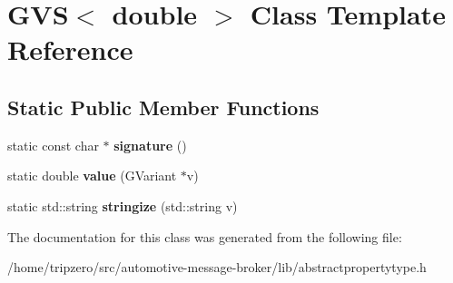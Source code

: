 \hypertarget{classGVS_3_01double_01_4}{\section{G\-V\-S$<$ double $>$ Class Template Reference}
\label{classGVS_3_01double_01_4}
}
\subsection*{Static Public Member Functions}
\begin{DoxyCompactItemize}
\item 
\hypertarget{classGVS_3_01double_01_4_a995d18f59b8a60af292ecb4778378f6a}{static const char $\ast$ {\bfseries signature} ()}\label{classGVS_3_01double_01_4_a995d18f59b8a60af292ecb4778378f6a}

\item 
\hypertarget{classGVS_3_01double_01_4_ab60f061e68f1e60367f62057a0549160}{static double {\bfseries value} (G\-Variant $\ast$v)}\label{classGVS_3_01double_01_4_ab60f061e68f1e60367f62057a0549160}

\item 
\hypertarget{classGVS_3_01double_01_4_aee0d8fdc467f97da7b072b1caa34b694}{static std\-::string {\bfseries stringize} (std\-::string v)}\label{classGVS_3_01double_01_4_aee0d8fdc467f97da7b072b1caa34b694}

\end{DoxyCompactItemize}


The documentation for this class was generated from the following file\-:\begin{DoxyCompactItemize}
\item 
/home/tripzero/src/automotive-\/message-\/broker/lib/abstractpropertytype.\-h\end{DoxyCompactItemize}
